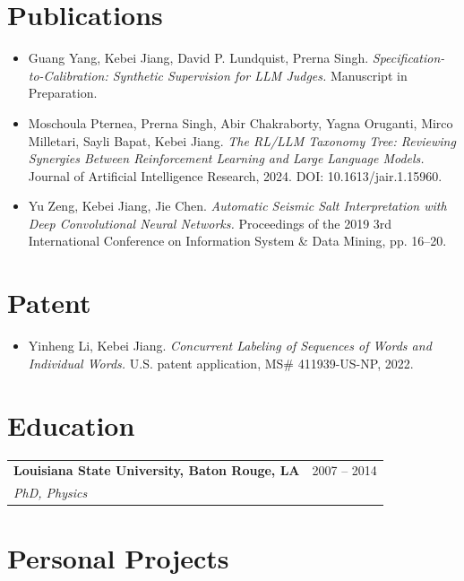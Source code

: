 \documentclass[10pt,letterpaper]{article}
\makeatletter
\newcommand{\headingwtitle}[3]{\vspace{2pt}\begin{tabularx}{\textwidth}{@{}Xr@{}}\textbf{#1} & #3\\[1pt] \textit{#2} & \end{tabularx}\vspace{-0pt}}
\makeatother
\begin{document}
\section*{Publications}
\begin{itemize}
\item Guang Yang, Kebei Jiang, David P. Lundquist, Prerna Singh. \textit{Specification-to-Calibration: Synthetic Supervision for LLM Judges.} Manuscript in Preparation.
\item Moschoula Pternea, Prerna Singh, Abir Chakraborty, Yagna Oruganti, Mirco Milletari, Sayli Bapat, Kebei Jiang. \textit{The RL/LLM Taxonomy Tree: Reviewing Synergies Between Reinforcement Learning and Large Language Models.} Journal of Artificial Intelligence Research, 2024. DOI: 10.1613/jair.1.15960.
\item Yu Zeng, Kebei Jiang, Jie Chen. \textit{Automatic Seismic Salt Interpretation with Deep Convolutional Neural Networks.} Proceedings of the 2019 3rd International Conference on Information System \& Data Mining, pp. 16--20.
\end{itemize}

\section*{Patent}
\begin{itemize}
\item Yinheng Li, Kebei Jiang. \textit{Concurrent Labeling of Sequences of Words and Individual Words.} U.S. patent application, MS\# 411939-US-NP, 2022.
\end{itemize}

\section*{Education}
\headingwtitle{Louisiana State University, Baton Rouge, LA}{PhD, Physics}{2007 -- 2014}

\section*{Personal Projects}
\end{document}
